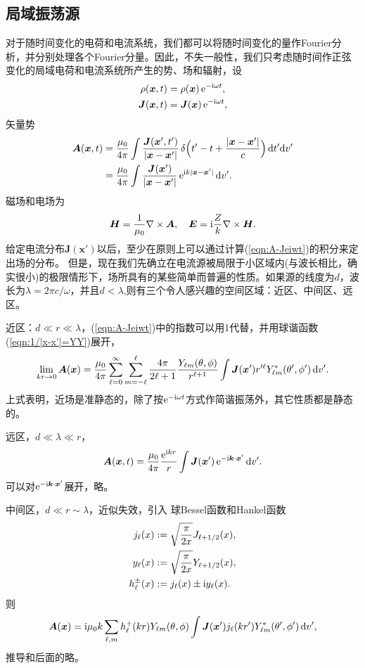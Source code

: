 \subsection{局域振荡源}
对于随时间变化的电荷和电流系统，我们都可以将随时间变化的量作Fourier分析，并分别处理各个Fourier分量。因此，不失一般性，我们只考虑随时间作正弦变化的局域电荷和电流系统所产生的势、场和辐射，设
\begin{align*}
    \rho(\bm x,t)&=\rho(\bm x)\mathop{}\!\mathrm{e}^{-\mathrm{i}\omega t},\\
    \bm J(\bm x,t)&=\bm J(\bm x)\mathop{}\!\mathrm{e}^{-\mathrm{i}\omega t},
\end{align*}
矢量势
\begin{align}
    \notag
    \bm A(\bm x,t)&=\frac{\mu_0}{4\pi}\int\frac{\bm J(\bm x',t')}{|\bm x-\bm x'|}\mathop{}\!\delta\Bigl(t'-t+\frac{|\bm x-\bm x'|}c\Bigr)\mathop{}\!\mathrm{d} t'\mathrm{d} v'\\
    \label{eqn:A-Jeiwt}
    &=\frac{\mu_0}{4\pi}\int\frac{\bm J(\bm x')}{|\bm x-\bm x'|}\mathop{}\!\mathrm{e}^{\mathrm{i} k|\bm x-\bm x'|}\mathop{}\!\mathrm{d} v'.
\end{align}
磁场和电场为
\[
    \bm H=\frac1{\mu_0}\nabla\times\bm A,\quad\bm E=\mathrm{i}\frac Zk\nabla\times\bm H.
\]
给定电流分布$\bm J(\bm x')$以后，至少在原则上可以通过计算(\ref{eqn:A-Jeiwt})的积分来定出场的分布。%
但是，现在我们先确立在电流源被局限于小区域内(与波长相比，确实很小)的极限情形下，场所具有的某些简单而普遍的性质。如果源的线度为$d$，波长为$\lambda=2\pi c/\omega$，并且$d<\lambda$,则有三个令人感兴趣的空间区域：近区、中间区、远区。

近区：$d\ll r\ll\lambda$，(\ref{eqn:A-Jeiwt})中的指数可以用1代替，并用球谐函数(\ref{eqn:1/|x-x'|=YY})展开，
\[
    \lim_{kr\to0}\bm A(\bm x)=\frac{\mu_0}{4\pi}\sum_{\ell=0}^\infty\sum_{m=-\ell}^\ell\frac{4\pi}{2\ell+1}\frac{Y_{\ell m}(\theta,\phi)}{r^{\ell+1}}\int\bm J(\bm x')r'^\ell Y^\ast_{\ell m}(\theta',\phi')\mathop{}\!\mathrm{d} v'.
\]
上式表明，近场是准静态的，除了按$\mathop{}\!\mathrm{e}^{-\mathrm{i}\omega t}$方式作简谐振荡外，其它性质都是静态的。

远区，$d\ll\lambda\ll r$，
\[
    \bm A(\bm x,t)=\frac{\mu_0}{4\pi}\frac{\mathop{}\!\mathrm{e}^{\mathrm{i} kr}}r\int\bm J(\bm x')\mathop{}\!\mathrm{e}^{-\mathrm{i}\bm k\cdot\bm x'}\mathop{}\!\mathrm{d} v'.
\]
可以对$\mathop{}\!\mathrm{e}^{-\mathrm{i}\bm k\cdot\bm x'}$展开，略。

中间区，$d\ll r\sim\lambda$，近似失效，引入
球Bessel函数和Hankel函数
\begin{align}
    j_\ell(x)&:=\sqrt{\frac\pi{2x}}J_{\ell+1/2}(x),\\
    y_\ell(x)&:=\sqrt{\frac\pi{2x}}Y_{\ell+1/2}(x),\\
    h^\pm_\ell(x)&:=j_\ell(x)\pm\mathrm{i} y_\ell(x).
\end{align}
则
\[
    \bm A(\bm x)=\mathrm{i}\mu_0k\sum_{\ell,m}h_\ell^+(kr)Y_{\ell m}(\theta,\phi)\int\bm J(\bm x')j_\ell(kr')Y^\ast_{\ell m}(\theta',\phi')\mathop{}\!\mathrm{d} v',
\]
推导和后面的略。

